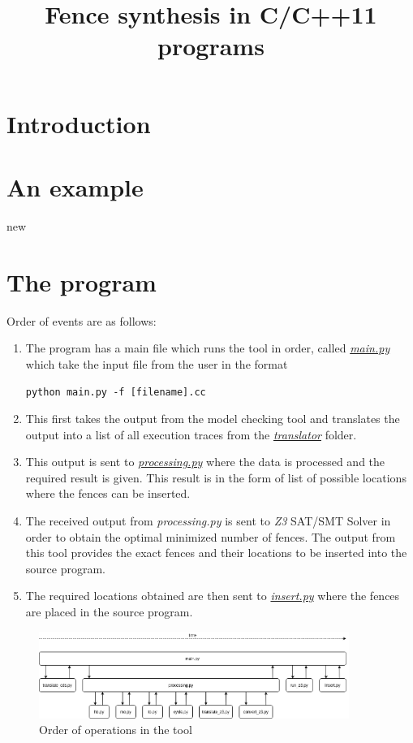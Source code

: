 \documentclass{article}
\date{}
\begin{document}
\title{Fence synthesis in C/C++11 programs}
\maketitle 

\section{Introduction} \label{sec:intro}


\section{An example}
\par
new

\section{The program}
\par
Order of events are as follows:
\begin{enumerate}
    \item The program has a main file which runs the tool in order, called \href{mainpy.tex}{\textit{main.py}} which take the input file from the user in the format \begin{center} \texttt{python main.py -f [filename].cc} \end{center} 
    
    \item This first takes the output from the model checking tool and translates the output into a list of all execution traces from the \href{translator.tex}{\textit{translator}} folder.
    
    \item This output is sent to \href{processing.tex}{\textit{processing.py}} where the data is processed and the required result is given. This result is in the form of list of possible locations where the fences can be inserted.
    
    \item The received output from \textit{processing.py} is sent to \textit{Z3} SAT/SMT Solver in order to obtain the optimal minimized number of fences. The output from this tool provides the exact fences and their locations to be inserted into the source program.
    
    \item The required locations obtained are then sent to \href{insert.tex}{\textit{insert.py}} where the fences are placed in the source program.
    
\end{enumerate}
\begin{figure}
    \centering
    \includegraphics[width=0.9\textwidth]{img/time-flow.png}
    \caption{Order of operations in the tool}
\end{figure}
\end{document}
